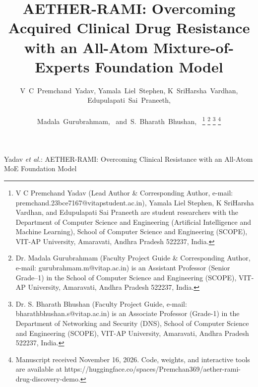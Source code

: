 \documentclass[10pt,journal,compsoc]{IEEEtran}
\begin{document}
\title{AETHER-RAMI: Overcoming Acquired Clinical Drug Resistance with an All-Atom Mixture-of-Experts Foundation Model}

\author{V~C~Premchand~Yadav,
        Yamala~Liel~Stephen,
        K~SriHarsha~Vardhan,
        Edupulapati~Sai~Praneeth,\\
        \\
        Madala~Gurubrahmam,~
        and~S.~Bharath~Bhushan,~%
\thanks{V C Premchand Yadav (Lead Author \& Corresponding Author, e-mail: premchand.23bce7167@vitapstudent.ac.in), Yamala Liel Stephen, K SriHarsha Vardhan, and Edupulapati Sai Praneeth are student researchers with the Department of Computer Science and Engineering (Artificial Intelligence and Machine Learning), School of Computer Science and Engineering (SCOPE), VIT-AP University, Amaravati, Andhra Pradesh 522237, India.}%
\thanks{Dr. Madala Gurubrahmam (Faculty Project Guide \& Corresponding Author, e-mail: gurubrahmam.m@vitap.ac.in) is an Assistant Professor (Senior Grade--1) in the School of Computer Science and Engineering (SCOPE), VIT-AP University, Amaravati, Andhra Pradesh 522237, India.}%
\thanks{Dr. S. Bharath Bhushan (Faculty Project Guide, e-mail: bharathbhushan.s@vitap.ac.in) is an Associate Professor (Grade-1) in the Department of Networking and Security (DNS), School of Computer Science and Engineering (SCOPE), VIT-AP University, Amaravati, Andhra Pradesh 522237, India.}%
\thanks{Manuscript received November 16, 2026. Code, weights, and interactive tools are available at https://huggingface.co/spaces/Premchan369/aether-rami-drug-discovery-demo.}}

%
{Yadav \MakeLowercase{\textit{et al.}}: AETHER-RAMI: Overcoming Clinical Resistance with an All-Atom MoE Foundation Model}
\end{document}
